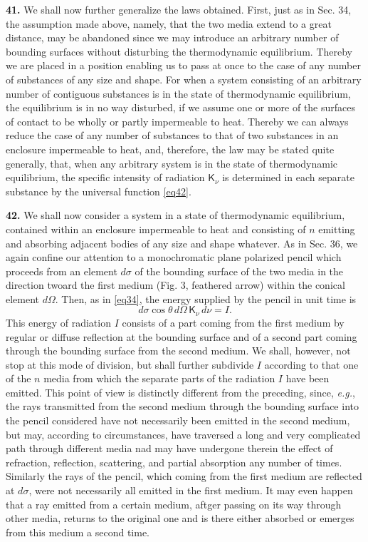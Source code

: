 \documentclass[12pt,oneside]{book}
\begin{document}
\textbf{41.} We shall now further generalize the laws obtained. First, just as in Sec. 34, the assumption made above, namely, that the two media extend to a great distance, may be abandoned since we may introduce an arbitrary number of bounding surfaces without disturbing the thermodynamic equilibrium. Thereby we are placed in a position enabling us to pass at once to the case of any number of substances of any size and shape. For when a system consisting of an arbitrary number of contiguous substances is in the state of thermodynamic equilibrium, the equilibrium is in no way disturbed, if we assume one or more of the surfaces of contact to be wholly or partly impermeable to heat. Thereby we can always reduce the case of any number of substances to that of two substances in an enclosure impermeable to heat, and, therefore, the law may be stated quite generally, that, when any arbitrary system is in the state of thermodynamic equilibrium, the specific intensity of radiation $\mathsf{K}_\nu$ is determined in each separate substance by the universal function \eqref{eq42}. \par 

\textbf{42.} We shall now consider a system in a state of thermodynamic equilibrium, contained within an enclosure impermeable to heat and consisting of $n$ emitting and absorbing adjacent bodies of any size and shape whatever. As in Sec. 36, we again confine our attention to a monochromatic plane polarized pencil which proceeds from an element $d\sigma$ of the bounding surface of the two media in the direction twoard the first medium (Fig. 3, feathered arrow) within the conical element $d\Omega$. Then, as in \eqref{eq34}, the energy supplied by the pencil in unit time is 
\begin{equation}
    d\sigma\cos\theta\,d\Omega\,\mathsf{K}_\nu\,d\nu=I.
    \label{eq43}
\end{equation}
This energy of radiation $I$ consists of a part coming from the first medium by regular or diffuse reflection at the bounding surface and of a second part coming through the bounding surface from the second medium. We shall, however, not stop at this mode of division, but shall further subdivide $I$ according to that one of the $n$ media from which the separate parts of the radiation $I$ have been emitted. This point of view is distinctly different from the preceding, since, \textit{e.g.}, the rays transmitted from the second medium through the bounding surface into the pencil considered have not necessarily been emitted in the second medium, but may, according to circumstances, have traversed a long and very complicated path through different media nad may have undergone therein the effect of refraction, reflection, scattering, and partial absorption any number of times. Similarly the rays of the pencil, which coming from the first medium are reflected at $d\sigma$, were not necessarily all emitted in the first medium. It may even happen that a ray emitted from a certain medium, aftger passing on its way through other media, returns to the original one and is there either absorbed or emerges from this medium a second time. \par 
\end{document}
